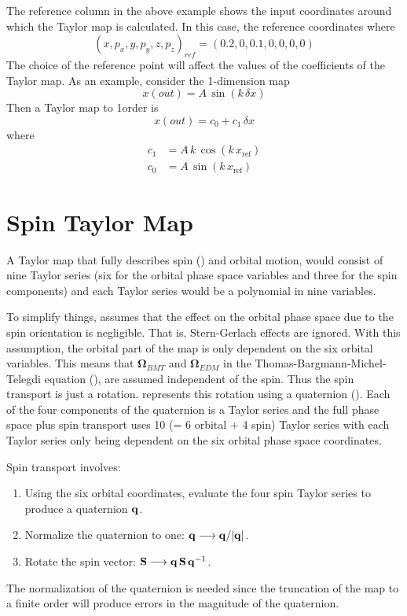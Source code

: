 The reference column in the above example shows the input coordinates around
which the Taylor map is calculated. In this case, the reference
coordinates where 
\begin{equation}
  (x, p_x, y, p_y, z, p_z)_{ref} = (0.2, 0, 0.1, 0, 0, 0, 0)
\end{equation}
The choice of the reference point will affect the values of the
coefficients of the Taylor map. As an example, consider the 1-dimension map
\begin{equation}
  x(out) = A \, \sin(k \, \delta x)
\end{equation}
Then a Taylor map to 1\St order is
\begin{equation}
  x(out) = c_0 + c_1 \, \delta x
\end{equation}
where
\begin{align}
  c_1 &= A \, k \, \cos(k \, x_{\text{ref}}) \\
  c_0 &= A \, \sin(k \, x_{\text{ref}})
\end{align}

\section{Spin Taylor Map}
\label{s:spin.map}

A Taylor map that fully describes spin () and orbital motion, would consist of nine
Taylor series (six for the orbital phase space variables and three for the spin components) and each
Taylor series would be a polynomial in nine variables.

To simplify things, \bmad assumes that the effect on the orbital phase space due to the spin
orientation is negligible. That is, Stern-Gerlach effects are ignored. With this assumption, the
orbital part of the map is only dependent on the six orbital variables. This means that
${\pmb\Omega}_{BMT}$ and ${\pmb\Omega}_{EDM}$ in the Thomas-Bargmann-Michel-Telegdi equation
(), are assumed independent of the spin. Thus the spin transport is just a rotation.
\bmad represents this rotation using a quaternion (). Each of the four components of
the quaternion is a Taylor series and the full phase space plus spin transport uses 10 (= 6 orbital
+ 4 spin) Taylor series with each Taylor series only being dependent on the six orbital phase space
coordinates.

Spin transport involves:
\begin{enumerate}[itemsep=-0.6ex, topsep=-0.9ex]
\item Using the six orbital coordinates, evaluate the four spin Taylor series to produce a quaternion ${\bf q}$.
\item Normalize the quaternion to one: ${\bf q} \longrightarrow {\bf q}/|{\bf q}|$.
\item Rotate the spin vector: ${\bf S} \longrightarrow {\bf q} \, {\bf S} \, {\bf q}^{-1}$.
\end{enumerate}
The  normalization of the quaternion is needed since the truncation of the map to a finite order will produce errors
in the magnitude of the quaternion.

